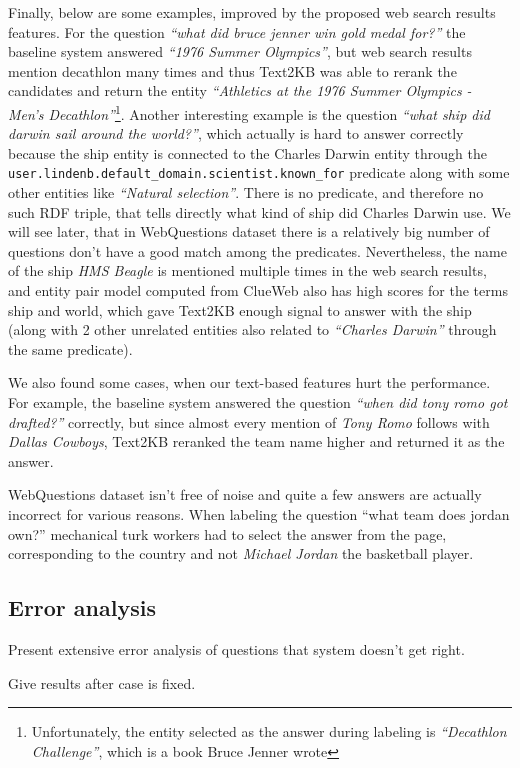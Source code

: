 Finally, below are some examples, improved by the proposed web search results features.
For the question \textit{``what did bruce jenner win gold medal for?''} the baseline system answered \textit{``1976 Summer Olympics''}, but web search results mention decathlon many times and thus Text2KB was able to rerank the candidates and return the entity \textit{``Athletics at the 1976 Summer Olympics - Men's Decathlon''}\footnote{Unfortunately, the entity selected as the answer during labeling is \textit{``Decathlon Challenge''}, which is a book Bruce Jenner wrote}.
Another interesting example is the question \textit{``what ship did darwin sail around the world?''}, which actually is hard to answer correctly because the ship entity is connected to the Charles Darwin entity through the \texttt{user.lindenb.default\_domain.scientist.known\_for} predicate along with some other entities like \textit{``Natural selection''}.
There is no predicate, and therefore no such RDF triple, that tells directly what kind of ship did Charles Darwin use.
We will see later, that in WebQuestions dataset there is a relatively big number of questions don't have a good match among the predicates.
Nevertheless, the name of the ship \textit{HMS Beagle} is mentioned multiple times in the web search results, and entity pair model computed from ClueWeb also has high scores for the terms ship and world, which gave Text2KB enough signal to answer with the ship (along with 2 other unrelated entities also related to \textit{``Charles Darwin''} through the same predicate).

We also found some cases, when our text-based features hurt the performance.
For example, the baseline system answered the question \textit{``when did tony romo got drafted?''} correctly, but since almost every mention of \textit{Tony Romo} follows with \textit{Dallas Cowboys}, Text2KB reranked the team name higher and returned it as the answer.

WebQuestions dataset isn't free of noise and quite a few answers are actually incorrect for various reasons.
When labeling the question ``what team does jordan own?'' mechanical turk workers had to select the answer from the page, corresponding to the country and not \textit{Michael Jordan} the basketball player.

\subsection{Error analysis}

Present extensive error analysis of questions that system doesn't get right.

Give results after case is fixed.
